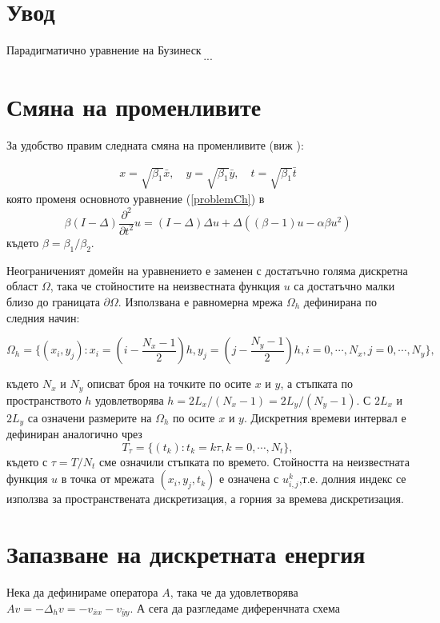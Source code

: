 \documentclass{article}
\newcommand{\be}{\begin{equation}}
\newcommand{\ee}{\end{equation}}
\newcommand{\rf}[1]{(\ref{#1})}
\begin{document}
\section{Увод}
Парадигматично уравнение на Бузинеск
\be\label{problemCh}
...
\ee
\section{Смяна на променливите}

За удобство правим следната смяна на променливите (виж \cite{ref25}):

\begin{align}
x = \sqrt{\beta_1} \bar{x}, \quad y = \sqrt{\beta_1} \bar{y}, \quad t = \sqrt{\beta_1} \bar{t} \nonumber
\end{align}
която променя основното уравнение \rf{problemCh} в
\be\label{problemVC}
 \beta (I-\Delta) \frac{\partial^2}{\partial t^2}u= 
(I-\Delta)\Delta u +\Delta( (\beta - 1 )u - \alpha \beta u^2 )
\ee
където $\beta = \beta_1/\beta_2$. 

Неограниченият домейн на уравнението е заменен с достатъчно голяма дискретна област $\Omega$, така че стойностите на неизвестната функция $u$ са достатъчно малки близо до границата $\partial \Omega$. Използвана е равномерна мрежа  $\Omega_h$ дефинирана по следния начин:

$$
\Omega_h = \{(x_i,y_j): x_i = (i-\frac{N_x-1}{2})h, y_j = (j-\frac{N_y-1}{2})h, i = 0,\cdots, N_x, j = 0 ,\cdots , N_y \},
$$

където $N_x$ и $N_y$ описват броя на точките по осите $x$ и $y$, а стъпката по пространството $h$ удовлетворява $h =2 L_x/(N_x-1) =2 L_y/(N_y-1)$.
С $2 L_x$ и $2 L_y$ са означени размерите на $\Omega_h$ по осите $x$ и $y$. Дискретния времеви интервал е дефиниран аналогично чрез
$$
T_{\tau} = \{(t_k): t_k = k\tau, k = 0,\cdots ,N_t \},
$$
където с $\tau = T/N_t$ сме означили стъпката по времето. Стойността на неизвестната функция $u$ в точка от мрежата $(x_i,y_j,t_k)$ е означена с $u_{i,j}^k$,т.е. долния индекс се използва за пространствената дискретизация, а горния за времева дискретизация.

\section{Запазване на дискретната енергия}
Нека да дефинираме оператора $A$, така че да удовлетворява $Av=-\Delta_h v=-v_{\bar{x}x} - v_{\bar{y}y}$. А сега да разгледаме диференчната схема
\end{document}
